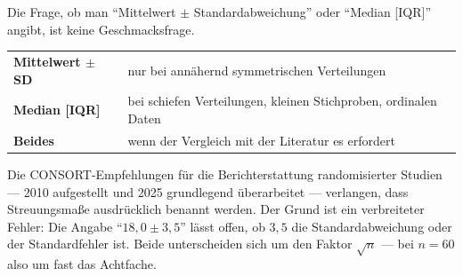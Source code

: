 \begin{forschung}
Die Frage, ob man \enquote{Mittelwert $\pm$ Standardabweichung} oder \enquote{Median [IQR]} angibt, ist keine Geschmacksfrage.

\begin{center}
{\small
\renewcommand{\arraystretch}{1.45}
\begin{tabular}{@{}P{3.0cm}P{5.4cm}@{}}
\toprule
\textbf{Mittelwert $\pm$ SD} & nur bei annähernd symmetrischen Verteilungen\\
\textbf{Median [IQR]} & bei schiefen Verteilungen, kleinen Stichproben, ordinalen Daten\\
\textbf{Beides} & wenn der Vergleich mit der Literatur es erfordert\\
\bottomrule
\end{tabular}}
\end{center}

Die CONSORT-Empfehlungen für die Berichterstattung randomisierter Studien --- 2010 aufgestellt und 2025 grundlegend überarbeitet --- verlangen, dass Streuungsmaße ausdrücklich benannt werden. Der Grund ist ein verbreiteter Fehler: Die Angabe \enquote{$18{,}0 \pm 3{,}5$} lässt offen, ob $3{,}5$ die Standardabweichung oder der Standardfehler ist. Beide unterscheiden sich um den Faktor $\sqrt{n}$ --- bei $n=60$ also um fast das Achtfache.

\begin{center}
\begin{minipage}{0.88\textwidth}
\end{minipage}
\end{center}
\end{forschung}

